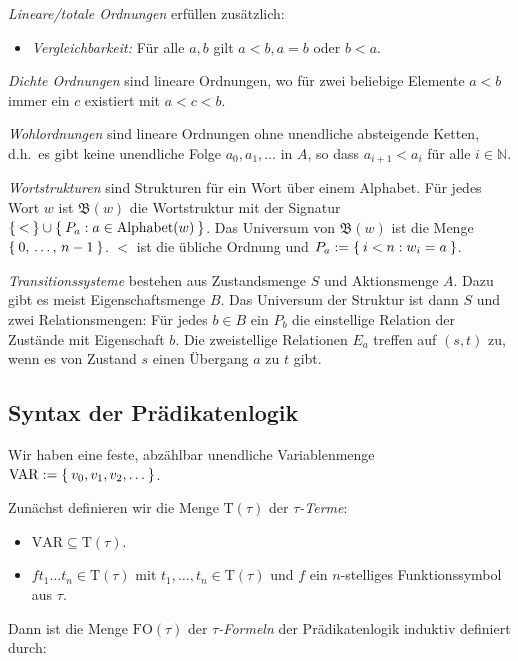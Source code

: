 \documentclass[a4paper,parskip=half*,DIV=15,fontsize=11pt]{scrartcl}
\newcommand{\FO}{\mathrm{FO}}
\newcommand{\VAR}{\mathrm{VAR}}
\newcommand{\T}{\mathrm{T}}
\begin{document}
\emph{Lineare/totale Ordnungen} erfüllen zusätzlich:
\begin{itemize}
  \item \emph{Vergleichbarkeit:} Für alle $a,b$ gilt $a < b, a = b$ oder $b < a$.
\end{itemize}

\emph{Dichte Ordnungen} sind lineare Ordnungen, wo für zwei beliebige Elemente $a < b$ immer ein $c$ existiert mit $a < c < b$.

\emph{Wohlordnungen} sind lineare Ordnungen ohne unendliche absteigende Ketten, d.h.\ es gibt keine unendliche Folge $a_0, a_1, \ldots$ in $A$, so dass $a_{i+1} < a_i$ für alle $i \in \mathbb{N}$.

\emph{Wortstrukturen} sind Strukturen für ein Wort über einem Alphabet. Für jedes Wort $w$ ist $\mathfrak{B}(w)$ die Wortstruktur mit der Signatur $\Set{<} \cup \Set{P_a : a \in \mathrm{Alphabet}(w)}$. Das Universum von $\mathfrak{B}(w)$ ist die Menge $\Set{0,\, \ldots,\, n-1}$. $<$ ist die übliche Ordnung und $P_a := \Set{i < n : w_i = a}$.

\emph{Transitionssysteme} bestehen aus Zustandsmenge $S$ und Aktionsmenge $A$. Dazu gibt es meist Eigenschaftsmenge $B$. Das Universum der Struktur ist dann $S$ und zwei Relationsmengen: Für jedes $b \in B$ ein $P_b$ die einstellige Relation der Zustände mit Eigenschaft $b$. Die zweistellige Relationen $E_a$ treffen auf $(s,t)$ zu, wenn es von Zustand $s$ einen Übergang $a$ zu $t$ gibt.

\subsection{Syntax der Prädikatenlogik}

Wir haben eine feste, abzählbar unendliche Variablenmenge $\VAR := \Set{v_0, v_1, v_2, \ldots}$.

Zunächst definieren wir die Menge $\T(\tau)$ der \emph{$\tau$-Terme}:
\begin{itemize}
    \item $\VAR \subseteq \T(\tau)$.
    \item $f t_1 \ldots t_n \in \T(\tau)$ mit $t_1, \ldots, t_n \in \T(\tau)$ und $f$ ein $n$-stelliges Funktionssymbol aus $\tau$.
\end{itemize}

Dann ist die Menge $\FO(\tau)$ der \emph{$\tau$-Formeln} der Prädikatenlogik induktiv definiert durch:
\end{document}
